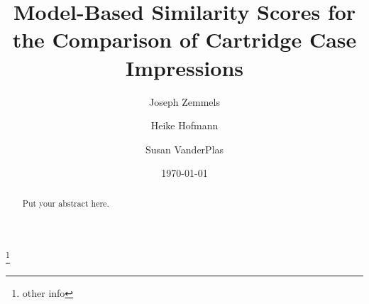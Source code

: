 \documentclass[reprint]{JASA}
\begin{document}

\title[]{Model-Based Similarity Scores for the Comparison of Cartridge
Case Impressions}



\author{Joseph Zemmels}
\thanks{other info}
\author{Heike Hofmann}


\author{Susan VanderPlas}






\date{\today}

\begin{abstract}
Put your abstract here.
\end{abstract}


\maketitle
\end{document}
